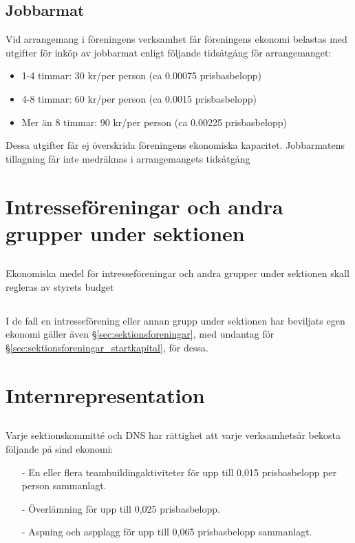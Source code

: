\documentclass[a4paper, 10pt]{article}
\begin{document}
\subsection{Jobbarmat}
Vid arrangemang i föreningens verksamhet får föreningens ekonomi belastas med utgifter för inköp av jobbarmat enligt följande tidsåtgång för arrangemanget:
\begin{itemize}
    \item 1-4 timmar: 30 kr/per person (ca 0.00075 prisbasbelopp)
    \item 4-8 timmar: 60 kr/per person (ca 0.0015 prisbasbelopp)
    \item Mer än 8 timmar: 90 kr/per person (ca 0.00225 prisbasbelopp)
\end{itemize}
Dessa utgifter får ej överskrida föreningens ekonomiska kapacitet. Jobbarmatens tillagning får inte medräknas i arrangemangets tidsåtgång

\section{Intresseföreningar och andra grupper under sektionen}
\subsection{}
Ekonomiska medel för intresseföreningar och andra grupper under sektionen skall regleras av styrets budget
\subsection{}
I de fall en intresseförening eller annan grupp under sektionen har beviljats egen ekonomi gäller även §\ref{sec:sektionsforeningar}, med undantag för §\ref{sec:sektionsforeningar_startkapital}, för dessa.

\section{Internrepresentation}
\subsection{}
\label{sec:internreps}
Varje sektionskommitté och DNS har rättighet att varje verksamhetsår bekosta följande på sind ekonomi:
\begin{itemize}
    \item[-] En eller flera teambuildingaktiviteter för upp till 0,015 prisbasbelopp per person sammanlagt.
    \item[-] Överlämning för upp till 0,025 prisbasbelopp.
    \item[-] Aspning och aspplagg för upp till 0,065 prisbasbelopp sammanlagt.
\end{itemize}
\end{document}
